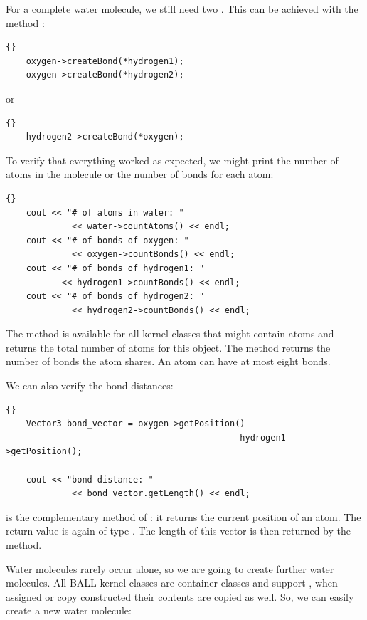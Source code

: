 \noindent
For a complete water molecule, we still need two . This can be
achieved with the method :
	
\begin{lstlisting}{}
	oxygen->createBond(*hydrogen1);
	oxygen->createBond(*hydrogen2);
\end{lstlisting}

or

\begin{lstlisting}{}
	hydrogen2->createBond(*oxygen);
\end{lstlisting}

\noindent
To verify that everything worked as expected, we might print the number of
atoms in the molecule or the number of bonds for each atom:
	
\begin{lstlisting}{}
	cout << "# of atoms in water: " 
 			 << water->countAtoms() << endl;
	cout << "# of bonds of oxygen: " 
			 << oxygen->countBonds() << endl;
	cout << "# of bonds of hydrogen1: " 
		   << hydrogen1->countBonds() << endl;
	cout << "# of bonds of hydrogen2: " 
			 << hydrogen2->countBonds() << endl;
\end{lstlisting}

\noindent
The method  is available for all kernel classes that might
contain atoms and returns the total number of atoms for this object. The
method  returns the number of bonds the atom shares. An
atom can have at most eight bonds.

We can also verify the bond distances:
\begin{lstlisting}{}
	Vector3 bond_vector = oxygen->getPosition() 
										    - hydrogen1->getPosition();

	cout << "bond distance: " 
			 << bond_vector.getLength() << endl;
\end{lstlisting}
	
\noindent
{} is the complementary method of : it
returns the current position of an atom. The return value is again of type
. The length of this vector is then returned by the
 method. 

Water molecules rarely occur alone, so we are going to create further water molecules.
All BALL kernel classes are container classes and support , \ie when assigned or copy constructed their contents are copied as
well. So, we can easily create a new water molecule:

